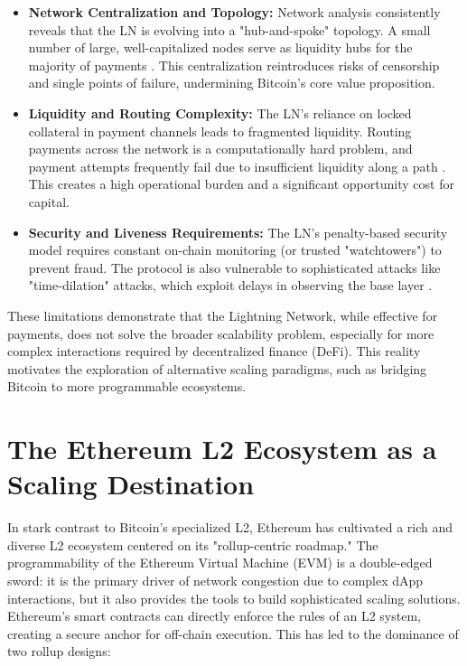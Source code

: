 \documentclass{DESSThesis}
\begin{document}
\begin{itemize}
    \item \textbf{Network Centralization and Topology:} Network analysis consistently reveals that the LN is evolving into a "hub-and-spoke" topology. A small number of large, well-capitalized nodes serve as liquidity hubs for the majority of payments \cite{martinazzi_evolving_2020}. This centralization reintroduces risks of censorship and single points of failure, undermining Bitcoin's core value proposition.
    \item \textbf{Liquidity and Routing Complexity:} The LN's reliance on locked collateral in payment channels leads to fragmented liquidity. Routing payments across the network is a computationally hard problem, and payment attempts frequently fail due to insufficient liquidity along a path \cite{pickhardt_optimally_2021}. This creates a high operational burden and a significant opportunity cost for capital.
    \item \textbf{Security and Liveness Requirements:} The LN's penalty-based security model requires constant on-chain monitoring (or trusted "watchtowers") to prevent fraud. The protocol is also vulnerable to sophisticated attacks like "time-dilation" attacks, which exploit delays in observing the base layer \cite{riard_time-dilation_2020}.
\end{itemize}
These limitations demonstrate that the Lightning Network, while effective for payments, does not solve the broader scalability problem, especially for more complex interactions required by decentralized finance (DeFi). This reality motivates the exploration of alternative scaling paradigms, such as bridging Bitcoin to more programmable ecosystems.

\section{The Ethereum L2 Ecosystem as a Scaling Destination}

In stark contrast to Bitcoin's specialized L2, Ethereum has cultivated a rich and diverse L2 ecosystem centered on its "rollup-centric roadmap." The programmability of the Ethereum Virtual Machine (EVM) is a double-edged sword: it is the primary driver of network congestion due to complex dApp interactions, but it also provides the tools to build sophisticated scaling solutions. Ethereum's smart contracts can directly enforce the rules of an L2 system, creating a secure anchor for off-chain execution. This has led to the dominance of two rollup designs:
\end{document}
